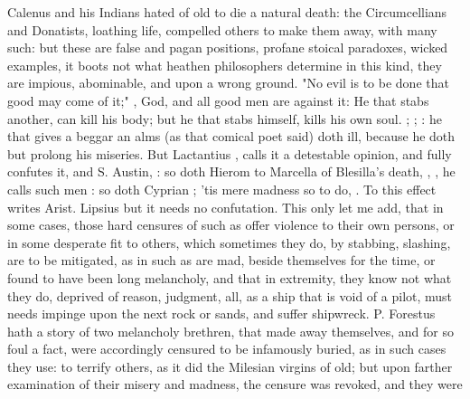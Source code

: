 Calenus and his Indians hated of old to die a natural
death: the Circumcellians and Donatists, loathing life, compelled others to
make them away, with many such: but these are false and
pagan positions, profane stoical paradoxes, wicked examples, it boots not what
heathen philosophers determine in this kind, they are impious, abominable, and
upon a wrong ground. "No evil is to be done that good may come of it;"
, God, and all good men are
against it: He that stabs another, can kill his body; but
he that stabs himself, kills his own soul. ; ; : he that gives a beggar an alms (as that
comical poet said) doth ill, because he doth but prolong his miseries. But
Lactantius , calls it a
detestable opinion, and fully confutes it,  and S. Austin, : so doth Hierom to Marcella of Blesilla's death,
, \etc{}, he calls such men : so doth Cyprian ; 'tis mere madness so to
do, . To this effect writes
Arist.  Lipsius  but it needs no confutation.
This only let me add, that in some cases, those hard
censures of such as offer violence to their own persons, or in some desperate
fit to others, which sometimes they do, by stabbing, slashing, \etc{} are to be
mitigated, as in such as are mad, beside themselves for the time, or found to
have been long melancholy, and that in extremity, they know not what they do,
deprived of reason, judgment, all, as a ship that is void
of a pilot, must needs impinge upon the next rock or sands, and suffer
shipwreck. P. Forestus hath a story of two melancholy
brethren, that made away themselves, and for so foul a fact, were accordingly
censured to be infamously buried, as in such cases they use: to terrify others,
as it did the Milesian virgins of old; but upon farther examination of their
misery and madness, the censure was revoked, and they were
